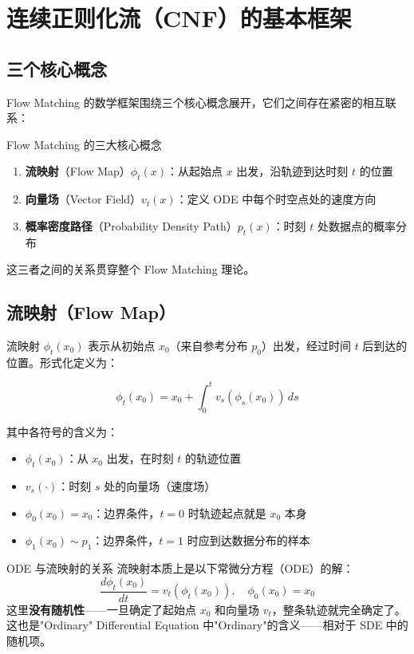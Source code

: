 \section{连续正则化流（CNF）的基本框架}

\subsection{三个核心概念}

Flow Matching 的数学框架围绕三个核心概念展开，它们之间存在紧密的相互联系：

\begin{importantbox}{Flow Matching 的三大核心概念}
\begin{enumerate}
    \item \textbf{流映射}（Flow Map）$\phi_t(x)$：从起始点 $x$ 出发，沿轨迹到达时刻 $t$ 的位置
    \item \textbf{向量场}（Vector Field）$v_t(x)$：定义 ODE 中每个时空点处的速度方向
    \item \textbf{概率密度路径}（Probability Density Path）$p_t(x)$：时刻 $t$ 处数据点的概率分布
\end{enumerate}
这三者之间的关系贯穿整个 Flow Matching 理论。
\end{importantbox}

\subsection{流映射（Flow Map）}

流映射 $\phi_t(x_0)$ 表示从初始点 $x_0$（来自参考分布 $p_0$）出发，经过时间 $t$ 后到达的位置。形式化定义为：

$$\phi_t(x_0) = x_0 + \int_0^t v_s(\phi_s(x_0)) \, ds$$

其中各符号的含义为：
\begin{itemize}
    \item $\phi_t(x_0)$：从 $x_0$ 出发，在时刻 $t$ 的轨迹位置
    \item $v_s(\cdot)$：时刻 $s$ 处的向量场（速度场）
    \item $\phi_0(x_0) = x_0$：边界条件，$t=0$ 时轨迹起点就是 $x_0$ 本身
    \item $\phi_1(x_0) \sim p_1$：边界条件，$t=1$ 时应到达数据分布的样本
\end{itemize}

\begin{knowledgebox}{ODE 与流映射的关系}
流映射本质上是以下常微分方程（ODE）的解：
$$\frac{d\phi_t(x_0)}{dt} = v_t(\phi_t(x_0)), \quad \phi_0(x_0) = x_0$$
这里\textbf{没有随机性}——一旦确定了起始点 $x_0$ 和向量场 $v_t$，整条轨迹就完全确定了。这也是"Ordinary" Differential Equation 中"Ordinary"的含义——相对于 SDE 中的随机项。
\end{knowledgebox}

